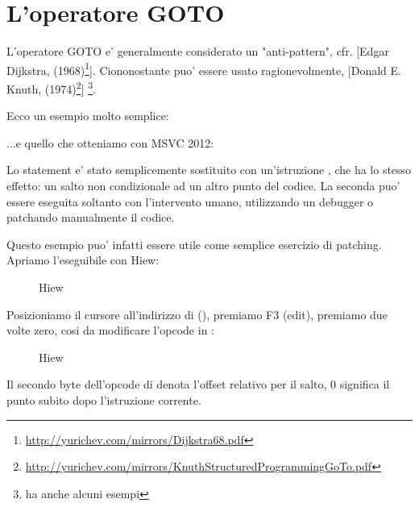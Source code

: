 \section{L'operatore GOTO}

L'operatore GOTO e' generalmente considerato un "anti-pattern", cfr. [Edgar Dijkstra,  (1968)\footnote{\url{http://yurichev.com/mirrors/Dijkstra68.pdf}}].
Ciononostante puo' essere usato ragionevolmente, [Donald E. Knuth,  (1974)\footnote{\url{http://yurichev.com/mirrors/KnuthStructuredProgrammingGoTo.pdf}}]
\footnote{\InSqBrackets{\CNotes} ha anche alcuni esempi}.

Ecco un esempio molto semplice:



...e quello che otteniamo con MSVC 2012:



Lo statement  e' stato semplicemente sostituito con un'istruzione \JMP, che ha lo stesso effetto: un salto non condizionale
ad un altro punto del codice.
La seconda \printf puo' essere eseguita soltanto con l'intervento umano, utilizzando un debugger o patchando manualmente il codice.

\par

\clearpage

Questo esempio puo' infatti essere utile come semplice esercizio di patching. Apriamo l'eseguibile con Hiew:

\begin{figure}[H]
\centering
{}
\caption{Hiew}
\label{fig:goto_hiew1}
\end{figure}

\clearpage
Posizioniamo il cursore all'indirizzo di \JMP (), 
premiamo F3 (edit), premiamo due volte zero, cosi da modificare l'opcode in :

\begin{figure}[H]
\centering
{}
\caption{Hiew}
\label{fig:goto_hiew2}
\end{figure}

Il secondo byte dell'opcode di \JMP denota l'offset relativo per il salto, 0 significa il punto subito dopo l'istruzione corrente.

